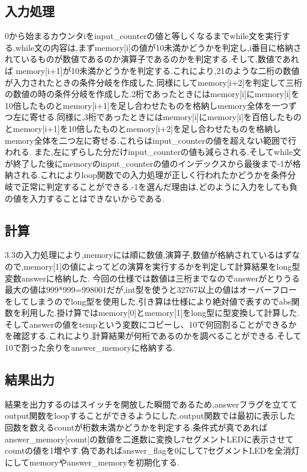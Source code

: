 \documentclass[dvipdfmx]{jarticle}
\begin{document}
    \subsection{入力処理}
    0から始まるカウンタiをinput\_counterの値と等しくなるまでwhile文を実行する.while文の内容は,まずmemory[i]の値が10未満かどうかを判定し,i番目に格納されているものが数値であるのか演算子であるのかを判定する.そして,数値であれば
    memory[i+1]が10未満かどうかを判定する.これにより,21のような二桁の数値が入力されたときの条件分岐を作成した.同様にしてmemory[i+2]を判定して三桁の数値の時の条件分岐を作成した.2桁であったときにはmemory[i]にmemory[i]を10倍したものとmemory[i+1]を足し合わせたものを格納しmemory全体を一つずつ左に寄せる.同様に,3桁であったときにはmemory[i]にmemory[i]を百倍したものとmemory[i+1]を10倍したものとmemory[i+2]を足し合わせたものを格納しmemory全体を二つ左に寄せる.これらはinput\_counterの値を超えない範囲で行われる.
    また,左にずらした分だけinput\_counterの値も減らされる.そしてwhile文が終了した後にmemoryのinput\_counterの値のインデックスから最後まで-1が格納される.これによりloop関数での入力処理が正しく行われたかどうかを条件分岐で正常に判定することができる.-1を選んだ理由は,どのように入力をしても負の値を入力することはできないからである.
    \subsection{計算}
    3.3の入力処理により,memoryには順に数値,演算子,数値が格納されているはずなので,memory[1]の値によってどの演算を実行するかを判定して計算結果をlong型変数answerに格納した.
    今回の仕様では数値は三桁までなのでanswerがとりうる最大の値は999*999=998001だが,int型を使うと32767以上の値はオーバーフローをしてしまうのでlong型を使用した.引き算は仕様により絶対値で表すのでabs関数を利用した.掛け算ではmemory[0]とmemory[1]をlong型に型変換して計算した.
    そしてanswerの値をtempという変数にコピーし、10で何回割ることができるかを確認する.これにより,計算結果が何桁であるのかを調べることができる.そして10で割った余りをanswer\_memoryに格納する.
    
    \subsection{結果出力}
    結果を出力するのはスイッチを開放した瞬間であるため,answerフラグを立ててoutput関数をloopすることができるようにした.output関数では最初に表示した回数を数えるcountが桁数未満かどうかを判定する.条件式が真であればanswer\_memory[count]の数値を二進数に変換し7セグメントLEDに表示させてcountの値を1増やす.偽であればanswer\_flagを0にして7セグメントLEDを全消灯にしてmemoryやanswer\_memoryを初期化する.
\end{document}

